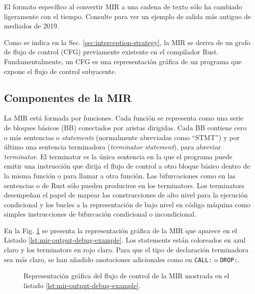 El formato específico al convertir \acrshort{MIR} a una cadena de texto sólo ha cambiado ligeramente con el
tiempo. Consulte \cite[Section 3.3]{meyer2020} para ver un ejemplo de salida más antiguo de
mediados de 2019.

Como se indica en la Sec. \ref{sec:interception-strategy}, la \acrshort{MIR} se deriva
de un grafo de flujo de control (\acrfull{CFG}) previamente existente en el compilador Rust.
Fundamentalmente, un \acrshort{CFG} es una
representación gráfica de un programa que expone el flujo de control subyacente.

\subsection{Componentes de la MIR}
\label{sec:mir-components}

La \acrshort{MIR} está formada por funciones.
Cada función se representa como una serie de bloques
básicos (\acrfull{BB}) conectados por aristas dirigidas.
Cada \acrshort{BB} contiene cero o más sentencias o \emph{statements}
(normalmente abreviadas como ``STMT'') y por último una sentencia terminadora (\emph{terminator statement}), para
abreviar \emph{terminator}.
El terminator es la única sentencia en la que el programa puede emitir una
instrucción que dirija el flujo de control a otro bloque básico dentro de la misma función o para
llamar a otra función.
Las bifurcaciones como en las sentencias  o  de Rust sólo pueden
producirse en los terminators. Los terminators desempeñan el papel de mapear las
construcciones de alto nivel para la ejecución condicional y los bucles a la representación de
bajo nivel en código máquina como simples instrucciones  de bifurcación condicional o
incondicional.

En la Fig. \ref{fig:mir-cfg-example} se presenta
la representación gráfica de la \acrshort{MIR} que aparece en el
Listado \ref{lst:mir-output-debug-example}.
Los statements están coloreados en azul claro y los terminators en rojo claro.
Para que el tipo de declaración terminadora sea más claro,
se han añadido anotaciones adicionales como en \texttt{CALL:} o \texttt{DROP:}.

\begin{figure}[!htb]
    \centering
    
    \caption{Representación gráfica del flujo de control de la MIR mostrada en el listado \ref{lst:mir-output-debug-example}.}
    \label{fig:mir-cfg-example}
\end{figure}

